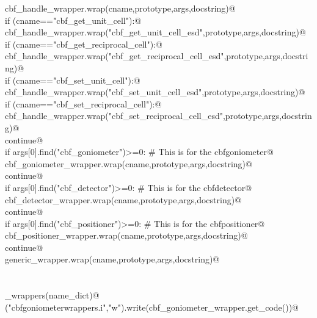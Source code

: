 \documentclass[10pt,a4paper,twoside,notitlepage]{article}
\begin{document}
\begin{flushleft}
\begin{minipage}{\linewidth}
\begin{list}{}{}
\mbox{}\verb@         cbf_handle_wrapper.wrap(cname,prototype,args,docstring)@\\
\mbox{}\verb@         if (cname=="cbf_get_unit_cell"):@\\
\mbox{}\verb@           cbf_handle_wrapper.wrap("cbf_get_unit_cell_esd",prototype,args,docstring)@\\
\mbox{}\verb@         if (cname=="cbf_get_reciprocal_cell"):@\\
\mbox{}\verb@           cbf_handle_wrapper.wrap("cbf_get_reciprocal_cell_esd",prototype,args,docstring)@\\
\mbox{}\verb@         if (cname=="cbf_set_unit_cell"):@\\
\mbox{}\verb@           cbf_handle_wrapper.wrap("cbf_set_unit_cell_esd",prototype,args,docstring)@\\
\mbox{}\verb@         if (cname=="cbf_set_reciprocal_cell"):@\\
\mbox{}\verb@           cbf_handle_wrapper.wrap("cbf_set_reciprocal_cell_esd",prototype,args,docstring)@\\
\mbox{}\verb@         continue@\\
\mbox{}\verb@      if args[0].find("cbf_goniometer")>=0: # This is for the cbfgoniometer@\\
\mbox{}\verb@         cbf_goniometer_wrapper.wrap(cname,prototype,args,docstring)@\\
\mbox{}\verb@         continue@\\
\mbox{}\verb@      if args[0].find("cbf_detector")>=0: # This is for the cbfdetector@\\
\mbox{}\verb@         cbf_detector_wrapper.wrap(cname,prototype,args,docstring)@\\
\mbox{}\verb@         continue@\\
\mbox{}\verb@      if args[0].find("cbf_positioner")>=0: # This is for the cbfpositioner@\\
\mbox{}\verb@         cbf_positioner_wrapper.wrap(cname,prototype,args,docstring)@\\
\mbox{}\verb@         continue@\\
\mbox{}\verb@      generic_wrapper.wrap(cname,prototype,args,docstring)@\\
\mbox{}\verb@@\\
\mbox{}\verb@@\\
\mbox{}\verb@generate_wrappers(name_dict)@\\
\mbox{}\verb@open("cbfgoniometerwrappers.i","w").write(cbf_goniometer_wrapper.get_code())@\\

\end{list}
\end{minipage}
\end{flushleft}
\end{document}
